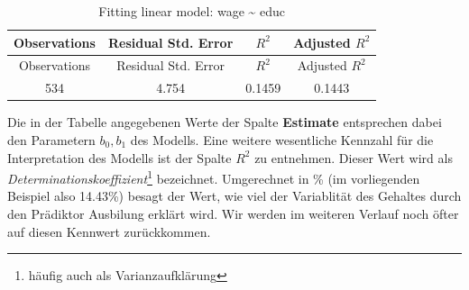 \documentclass[]{article}
\let\rmarkdownfootnote\footnote%
\def\footnote{\protect\rmarkdownfootnote}
\begin{document}
\begin{longtable}[]{@{}cccc@{}}
\caption{Fitting linear model: wage \textasciitilde{}
educ}\tabularnewline
\toprule
\begin{minipage}[b]{0.18\columnwidth}\centering\strut
Observations\strut
\end{minipage} & \begin{minipage}[b]{0.27\columnwidth}\centering\strut
Residual Std. Error\strut
\end{minipage} & \begin{minipage}[b]{0.11\columnwidth}\centering\strut
\(R^2\)\strut
\end{minipage} & \begin{minipage}[b]{0.20\columnwidth}\centering\strut
Adjusted \(R^2\)\strut
\end{minipage}\tabularnewline
\midrule
\endfirsthead
\toprule
\begin{minipage}[b]{0.18\columnwidth}\centering\strut
Observations\strut
\end{minipage} & \begin{minipage}[b]{0.27\columnwidth}\centering\strut
Residual Std. Error\strut
\end{minipage} & \begin{minipage}[b]{0.11\columnwidth}\centering\strut
\(R^2\)\strut
\end{minipage} & \begin{minipage}[b]{0.20\columnwidth}\centering\strut
Adjusted \(R^2\)\strut
\end{minipage}\tabularnewline
\midrule
\endhead
\begin{minipage}[t]{0.18\columnwidth}\centering\strut
534\strut
\end{minipage} & \begin{minipage}[t]{0.27\columnwidth}\centering\strut
4.754\strut
\end{minipage} & \begin{minipage}[t]{0.11\columnwidth}\centering\strut
0.1459\strut
\end{minipage} & \begin{minipage}[t]{0.20\columnwidth}\centering\strut
0.1443\strut
\end{minipage}\tabularnewline
\bottomrule
\end{longtable}

Die in der Tabelle angegebenen Werte der Spalte \textbf{Estimate}
entsprechen dabei den Parametern \(b_0, b_1\) des Modells. Eine weitere
wesentliche Kennzahl für die Interpretation des Modells ist der Spalte
\(R^2\) zu entnehmen. Dieser Wert wird als
\emph{Determinationskoeffizient}\footnote{häufig auch als
  Varianzaufklärung} bezeichnet. Umgerechnet in \% (im vorliegenden
Beispiel also 14.43\%) besagt der Wert, wie viel der Variablität des
Gehaltes durch den Prädiktor Ausbilung erklärt wird. Wir werden im
weiteren Verlauf noch öfter auf diesen Kennwert zurückkommen.
\end{document}

